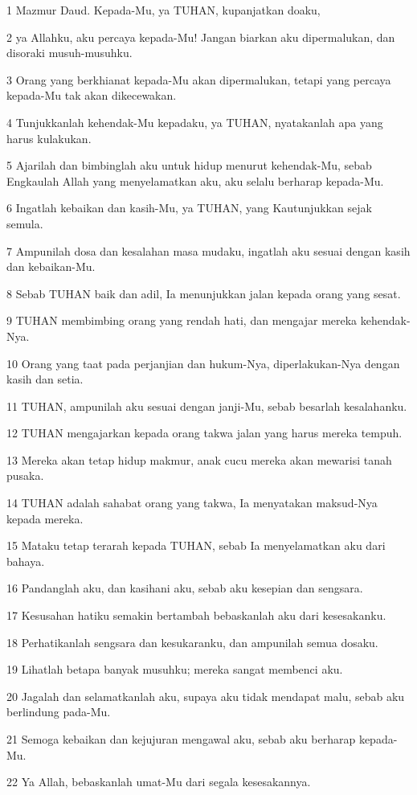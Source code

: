 \par 1 Mazmur Daud. Kepada-Mu, ya TUHAN, kupanjatkan doaku,
\par 2 ya Allahku, aku percaya kepada-Mu! Jangan biarkan aku dipermalukan, dan disoraki musuh-musuhku.
\par 3 Orang yang berkhianat kepada-Mu akan dipermalukan, tetapi yang percaya kepada-Mu tak akan dikecewakan.
\par 4 Tunjukkanlah kehendak-Mu kepadaku, ya TUHAN, nyatakanlah apa yang harus kulakukan.
\par 5 Ajarilah dan bimbinglah aku untuk hidup menurut kehendak-Mu, sebab Engkaulah Allah yang menyelamatkan aku, aku selalu berharap kepada-Mu.
\par 6 Ingatlah kebaikan dan kasih-Mu, ya TUHAN, yang Kautunjukkan sejak semula.
\par 7 Ampunilah dosa dan kesalahan masa mudaku, ingatlah aku sesuai dengan kasih dan kebaikan-Mu.
\par 8 Sebab TUHAN baik dan adil, Ia menunjukkan jalan kepada orang yang sesat.
\par 9 TUHAN membimbing orang yang rendah hati, dan mengajar mereka kehendak-Nya.
\par 10 Orang yang taat pada perjanjian dan hukum-Nya, diperlakukan-Nya dengan kasih dan setia.
\par 11 TUHAN, ampunilah aku sesuai dengan janji-Mu, sebab besarlah kesalahanku.
\par 12 TUHAN mengajarkan kepada orang takwa jalan yang harus mereka tempuh.
\par 13 Mereka akan tetap hidup makmur, anak cucu mereka akan mewarisi tanah pusaka.
\par 14 TUHAN adalah sahabat orang yang takwa, Ia menyatakan maksud-Nya kepada mereka.
\par 15 Mataku tetap terarah kepada TUHAN, sebab Ia menyelamatkan aku dari bahaya.
\par 16 Pandanglah aku, dan kasihani aku, sebab aku kesepian dan sengsara.
\par 17 Kesusahan hatiku semakin bertambah bebaskanlah aku dari kesesakanku.
\par 18 Perhatikanlah sengsara dan kesukaranku, dan ampunilah semua dosaku.
\par 19 Lihatlah betapa banyak musuhku; mereka sangat membenci aku.
\par 20 Jagalah dan selamatkanlah aku, supaya aku tidak mendapat malu, sebab aku berlindung pada-Mu.
\par 21 Semoga kebaikan dan kejujuran mengawal aku, sebab aku berharap kepada-Mu.
\par 22 Ya Allah, bebaskanlah umat-Mu dari segala kesesakannya.

